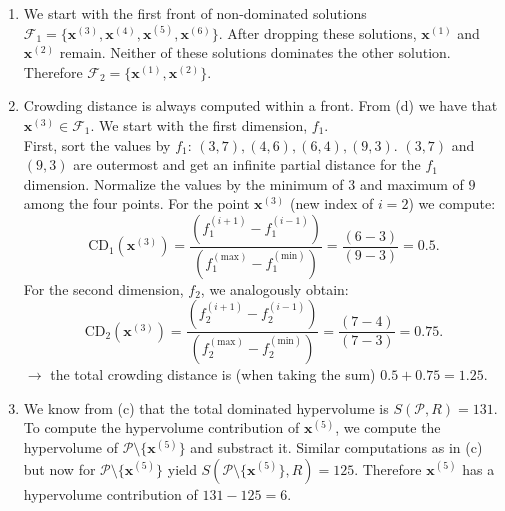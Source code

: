 \documentclass[a4paper]{article}
\begin{document}
{\begin{enumerate}
  For the four rectangles from left to right:
  \begin{itemize}
    \item $(4-3) \cdot (15-7) = 8$
    \item $(6-4) \cdot (15-6) = 18$
    \item $(9-6) \cdot (15-4) = 33$
    \item $(15-9) \cdot (15-3) = 72$
  \end{itemize}
  $\rightarrow S(\mathcal{P}, R) = 8+18+33+72 = 131$.
\item We start with the first front of non-dominated solutions $\mathcal{F}_{1} = \{\mathbf{x}^{(3)}, \mathbf{x}^{(4)}, \mathbf{x}^{(5)}, \mathbf{x}^{(6)}\}$.
  After dropping these solutions, $\mathbf{x}^{(1)}$ and $\mathbf{x}^{(2)}$ remain. Neither of these solutions dominates the other solution.
  Therefore $\mathcal{F}_{2} = \{\mathbf{x}^{(1)}, \mathbf{x}^{(2)}\}$.
\item Crowding distance is always computed within a front. From (d) we have that $\mathbf{x}^{(3)} \in \mathcal{F}_{1}$.
  We start with the first dimension, $f_{1}$.\\
  First, sort the values by $f_{1}$: $(3,7),(4,6),(6,4),(9,3)$.
  $(3, 7)$ and $(9, 3)$ are outermost and get an infinite partial distance for the $f_{1}$ dimension.
  Normalize the values by the minimum of $3$ and maximum of $9$ among the four points.
  For the point $\mathbf{x}^{(3)}$ (new index of $i = 2$) we compute:
  $$\mathrm{CD}_{1}(\mathbf{x}^{(3)}) = \frac{(f_{1}^{(i+1)} - f_{1}^{(i-1)})}{(f_{1}^{(\mathrm{max})} - f_{1}^{(\mathrm{min})})} = \frac{(6 - 3)}{(9 - 3)} = 0.5.$$
  For the second dimension, $f_{2}$, we analogously obtain:
  $$\mathrm{CD}_{2}(\mathbf{x}^{(3)}) = \frac{(f_{2}^{(i+1)} - f_{2}^{(i-1)})}{(f_{2}^{(\mathrm{max})} - f_{2}^{(\mathrm{min})})} = \frac{(7 - 4)}{(7 - 3)} = 0.75.$$
  $\rightarrow$ the total crowding distance is (when taking the sum) $0.5 + 0.75 = 1.25$.
\item We know from (c) that the total dominated hypervolume is $S(\mathcal{P}, R) = 131$.
  To compute the hypervolume contribution of $\mathbf{x}^{(5)}$, we compute the hypervolume of $\mathcal{P} \setminus \{\mathbf{x}^{(5)}\}$ and substract it.
  Similar computations as in (c) but now for $\mathcal{P} \setminus \{\mathbf{x}^{(5)}\}$ yield $S(\mathcal{P} \setminus \{\mathbf{x}^{(5)}\}, R) = 125$. Therefore $\mathbf{x}^{(5)}$ has a hypervolume contribution of $131 - 125 = 6$.
\end{enumerate}
}
\end{document}
